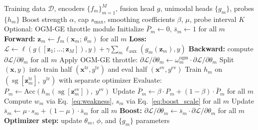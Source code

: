 \documentclass{article}
\newcommand{\loss}{\mathcal{L}}
\newcommand{\encoder}{f}
\newcommand{\probe}{h}
\newcommand{\sg}{\operatorname{sg}}
\begin{document}
\begin{algorithm}[H]
\caption{Probe-Guided Gradient Boosting (full training pass over $\mathcal{D}$). Notation: $P_m$ per-batch probe accuracy with smoothed estimate $\bar{P}_m$; $\phi$ fusion-head parameters; $\sg[\cdot]$ stop-gradient operator (\S\ref{sec:probes}). Auxiliary-loss weight $\gamma$ and optional OGM-GE throttle $\omega_m^{\text{ogm}} \leq 1$ are introduced in \S\ref{sec:compose}.}
\label{alg:pgb}
\begin{algorithmic}[1]
\REQUIRE Training data $\mathcal{D}$, encoders $\{\encoder_m\}_{m=1}^M$, fusion head $g$, unimodal heads $\{g_m\}$, probes $\{\probe_m\}$
\REQUIRE Boost strength $\alpha$, cap $s_{\max}$, smoothing coefficients $\beta$, $\mu$, probe interval $K$
\REQUIRE Optional: OGM-GE throttle module
\STATE Initialize $\bar{P}_m \leftarrow 0$, $\bar{s}_m \leftarrow 1$ for all $m$
    \STATE \textbf{Forward:} $\mathbf{z}_m \leftarrow \encoder_m(\mathbf{x}_m;\,\theta_m)$ for all $m$
    \STATE \textbf{Loss:} $\loss \leftarrow \ell(g([\mathbf{z}_1;\ldots;\mathbf{z}_M]), y) + \gamma \sum_m \ell_{\text{aux}}(g_m(\mathbf{z}_m), y)$
    \STATE \textbf{Backward:} compute $\partial\loss/\partial\theta_m$ for all $m$
        \STATE Apply OGM-GE throttle: $\partial\loss/\partial\theta_m \leftarrow \omega_m^{\text{ogm}} \cdot \partial\loss/\partial\theta_m$
    \ENDIF
        \STATE Split $(\mathbf{x}, y)$ into train half $(\mathbf{x}^{\text{tr}}, y^{\text{tr}})$ and eval half $(\mathbf{x}^{\text{ev}}, y^{\text{ev}})$
            \STATE Train $\probe_m$ on $(\sg[\mathbf{z}_m^{\text{tr}}],\; y^{\text{tr}})$ with separate optimizer
            \STATE Evaluate: $P_m \leftarrow \text{Acc}(\probe_m(\sg[\mathbf{z}_m^{\text{ev}}]),\; y^{\text{ev}})$
        \ENDFOR
        \STATE Update $\bar{P}_m \leftarrow \beta \cdot P_m + (1-\beta) \cdot \bar{P}_m$ for all $m$
        \STATE Compute $w_m$ via Eq.~\eqref{eq:weakness}, $s_m$ via Eq.~\eqref{eq:boost_scale} for all $m$
        \STATE Update $\bar{s}_m \leftarrow \mu \cdot s_m + (1-\mu) \cdot \bar{s}_m$ for all $m$
    \ENDIF
    \STATE \textbf{Boost:} $\partial\loss/\partial\theta_m \leftarrow \bar{s}_m \cdot \partial\loss/\partial\theta_m$ for all $m$
    \STATE \textbf{Optimizer step:} update $\theta_m$, $\phi$, and $\{g_m\}$ parameters
\ENDFOR
\end{algorithmic}
\end{algorithm}
\end{document}
